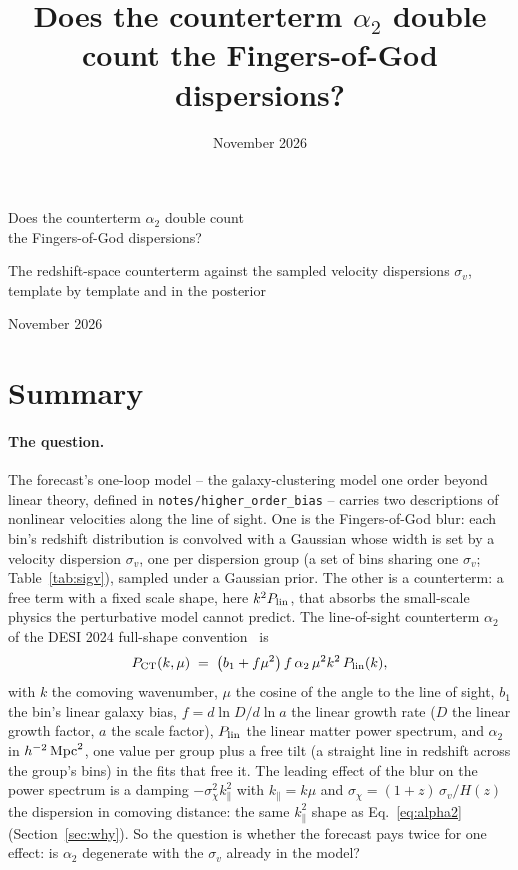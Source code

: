 \documentclass[11pt]{article}
\title{Does the counterterm $\alpha_2$ double count the
  Fingers-of-God dispersions?}
\date{November 2026}
\author{}
\newcommand{\sv}{\sigma_v}
\newcommand{\us}{\_\allowbreak}
\begin{document}
\begin{center}
  {\LARGE Does the counterterm $\alpha_2$ double count\\[0.3em]
    the Fingers-of-God dispersions?\par}
  \vspace{0.6em}
  {\large The redshift-space counterterm against the sampled velocity
    dispersions $\sv$,\\ template by template and in the posterior\par}
  \vspace{1em}
  {\large November 2026\par}
\end{center}
\vspace{1em}

\section{Summary}
\label{sec:summary}

\paragraph{The question.}
The forecast's one-loop model -- the galaxy-clustering model one
order beyond linear theory, defined in
\texttt{notes/higher\us order\us bias} -- carries two descriptions of
nonlinear velocities along the line of sight.  One is the
Fingers-of-God blur: each bin's redshift distribution is convolved
with a Gaussian whose width is set by a velocity dispersion $\sv$, one
per dispersion group (a set of bins sharing one $\sv$;
Table~\ref{tab:sigv}), sampled under a Gaussian prior.  The other is a
counterterm: a free term with a fixed scale shape, here
$k^2 P_{\rm lin}$, that absorbs the small-scale physics the
perturbative model cannot predict.  The line-of-sight counterterm
$\alpha_2$ of the DESI 2024 full-shape convention~\cite{Maus2024} is
\begin{equation}
  P_{\rm CT}(k, \mu) \;=\; \bigl(b_1 + f\mu^2\bigr)\,
  f\,\alpha_2\,\mu^2 k^2\,P_{\rm lin}(k) ,
  \label{eq:alpha2}
\end{equation}
with $k$ the comoving wavenumber, $\mu$ the cosine of the angle to the
line of sight, $b_1$ the bin's linear galaxy bias, $f = d\ln D/d\ln a$
the linear growth rate ($D$ the linear growth factor, $a$ the scale
factor), $P_{\rm lin}$ the linear matter power spectrum, and
$\alpha_2$ in $h^{-2}\,{\rm Mpc}^2$, one value per group plus a free
tilt (a straight line in redshift across the group's bins) in the
fits that free it.  The leading effect of the blur
on the power spectrum is a damping $-\sigma_\chi^2 k_\parallel^2$ with
$k_\parallel = k\mu$ and $\sigma_\chi = (1 + z)\,\sv/H(z)$ the
dispersion in comoving distance: the same $k_\parallel^2$ shape as
Eq.~\eqref{eq:alpha2} (Section~\ref{sec:why}).  So the question is
whether the forecast pays twice for one effect: is $\alpha_2$
degenerate with the $\sv$ already in the model?
\end{document}
